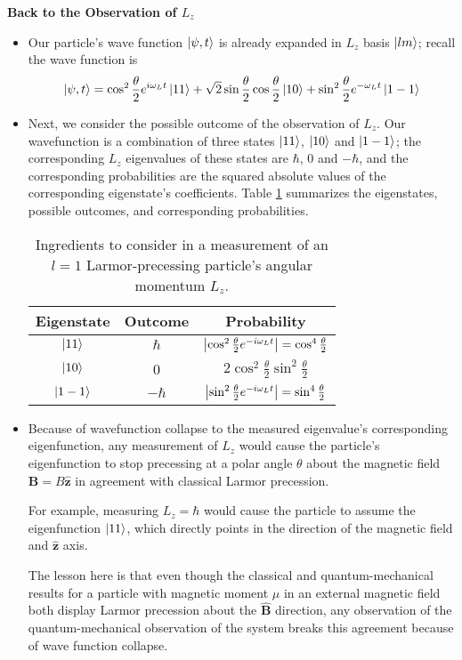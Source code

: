 \documentclass[11pt, a4paper]{article}
\renewcommand{\vec}[1]{\bm{#1}} %
\newcommand{\uvec}[1]{\hat{\vec{#1}}} %
\begin{document}
\textbf{Back to the Observation of $ L_{z} $}
\begin{itemize}
	\item Our particle's wave function $ \ket{\psi, t} $ is already expanded in $ L_{z} $ basis $ \ket{lm} $; recall the wave function is 
	\begin{equation*}
		\ket{\psi, t} =\cos^{2} \frac{\theta}{2} e^{i \omega_{L} t}\ket{11} + \sqrt{2}\sin \frac{\theta}{2} \cos \frac{\theta}{2} \ket{10} + \sin^{2}\frac{\theta}{2} e^{-\omega_{L} t}\ket{1 -1}
	\end{equation*}
	
	\item Next, we consider the possible outcome of the observation of $ L_{z} $. Our wavefunction is a combination of three states $ \ket{11} $, $ \ket{10} $ and $ \ket{1-1} $; the corresponding $ L_{z} $ eigenvalues of these states are $ \hbar $, $ 0 $ and $ -\hbar $, and the corresponding probabilities are the squared absolute values of the corresponding eigenstate's coefficients. Table \ref{qmv:table:larmor-Lz} summarizes the eigenstates, possible outcomes, and corresponding probabilities.
	\begin{table}
	\centering 
	\begin{tabular}{c|c|c}
		Eigenstate & Outcome & Probability \\
		\hline {\rule{0pt}{2.6ex}} \hspace{-7pt} 
		$ \ket{11} $ & $ \hbar $  & $ \abs{\cos^{2}\frac{\theta}{2}e^{-i\omega_{L}t}} = \cos^{4}\frac{\theta}{2} $\\[1mm]
		$ \ket{10} $ & 0 & $ 2 \cos^{2}\frac{\theta}{2}\sin^{2}\frac{\theta}{2} $\\[1mm]
		$ \ket{1-1} $ & $ -\hbar $  & $ \abs{\sin^{2}\frac{\theta}{2}e^{-i\omega_{L}t}} = \sin^{4}\frac{\theta}{2} $
	\end{tabular}
	\caption{Ingredients to consider in a measurement of an $ l=1 $ Larmor-precessing particle's angular momentum $ L_{z} $. }
	\label{qmv:table:larmor-Lz}
	\end{table}
	
	\item Because of wavefunction collapse to the measured eigenvalue's corresponding eigenfunction, any measurement of $ L_{z} $ would cause the particle's eigenfunction to stop precessing at a polar angle $ \theta $ about the magnetic field $ \vec{B} = B\uvec{z} $ in agreement with classical Larmor precession.
	
	For example, measuring $ L_{z} = \hbar $ would cause the particle to assume the eigenfunction $ \ket{11} $, which directly points in the direction of the magnetic field and $ \uvec{z} $ axis. 
	
	The lesson here is that even though the classical and quantum-mechanical results for a particle with magnetic moment $ \mu $ in an external magnetic field both display Larmor precession about the $ \uvec{B} $ direction, any observation of the quantum-mechanical observation of the system breaks this agreement because of wave function collapse.
	
\end{itemize}
\end{document}
